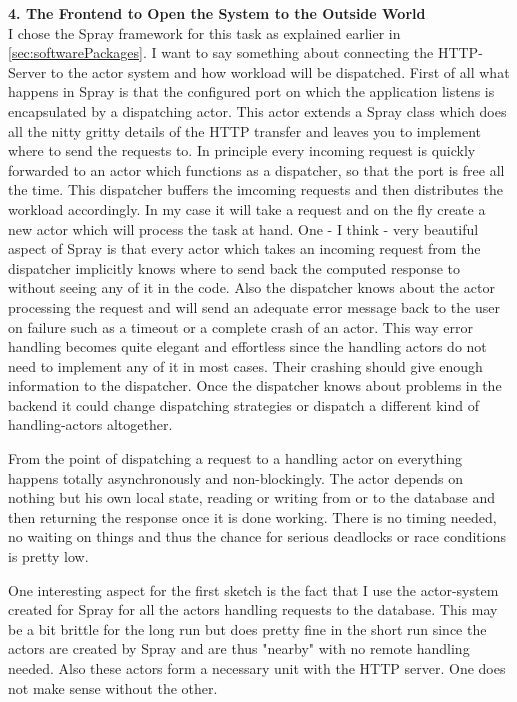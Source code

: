 \documentclass[11p]{scrartcl}
\begin{document}
\textbf{4. The Frontend to Open the System to the Outside World}\\
I chose the Spray framework for this task as explained earlier in \ref{sec:softwarePackages}. I want to say something about connecting the HTTP-Server to the actor system and how workload will be dispatched.
First of all what happens in Spray is that the configured port on which the application listens is encapsulated by a dispatching actor. This actor extends a Spray class which does all the nitty gritty details of the HTTP transfer and leaves you to implement where to send the requests to. In principle every incoming request  is quickly forwarded to an actor which functions as a dispatcher, so that the port is free all the time. This dispatcher buffers the imcoming requests and then distributes the workload accordingly. In my case it will take a request and on the fly create a new actor which will process the task at hand. One - I think - very beautiful aspect of Spray is that every actor which takes an incoming request from the dispatcher implicitly knows where to send back the computed response to without seeing any of it in the code. Also the dispatcher knows about the actor processing the request and will send an adequate error message back to the user on failure such as a timeout or a complete crash of an actor. This way error handling becomes quite elegant and effortless since the handling actors do not need to implement any of it in most cases. Their crashing should give enough information to the dispatcher. Once the dispatcher knows about problems in the backend it could change dispatching strategies or dispatch a different kind of handling-actors altogether.

From the point of dispatching a request to a handling actor on everything happens totally asynchronously and non-blockingly. The actor depends on nothing but his own local state, reading or writing from or to the database and then returning the response once it is done working. There is no timing needed, no waiting on things and thus the chance for serious deadlocks or race conditions is pretty low.

One interesting aspect for the first sketch is the fact that I use the actor-system created for Spray for all the actors handling requests to the database. This may be a bit brittle for the long run but does pretty fine in the short run since the actors are created by Spray and are thus "nearby" with no remote handling needed. Also these actors form a necessary unit with the HTTP server. One does not make sense without the other.
\end{document}
